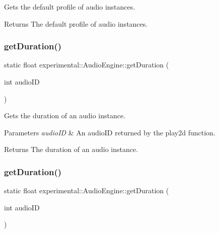 Gets the default profile of audio instances.

\begin{DoxyReturn}{Returns}
The default profile of audio instances. 
\end{DoxyReturn}
\mbox{\label{classexperimental_1_1AudioEngine_a09b8db5b79cc1dbdd99b57047cbc9d79}} 
\subsubsection{\texorpdfstring{get\+Duration()}{getDuration()}\hspace{0.1cm}{\footnotesize\ttfamily [1/2]}}
{\footnotesize\ttfamily static float experimental\+::\+Audio\+Engine\+::get\+Duration (\begin{DoxyParamCaption}\item[{int}]{audio\+ID }\end{DoxyParamCaption})\hspace{0.3cm}{\ttfamily [static]}}

Gets the duration of an audio instance.


\begin{DoxyParams}{Parameters}
{\em audio\+ID} & An audio\+ID returned by the play2d function. \\
\hline
\end{DoxyParams}
\begin{DoxyReturn}{Returns}
The duration of an audio instance. 
\end{DoxyReturn}
\mbox{\label{classexperimental_1_1AudioEngine_a09b8db5b79cc1dbdd99b57047cbc9d79}} 
\subsubsection{\texorpdfstring{get\+Duration()}{getDuration()}\hspace{0.1cm}{\footnotesize\ttfamily [2/2]}}
{\footnotesize\ttfamily static float experimental\+::\+Audio\+Engine\+::get\+Duration (\begin{DoxyParamCaption}\item[{int}]{audio\+ID }\end{DoxyParamCaption})\hspace{0.3cm}{\ttfamily [static]}}

